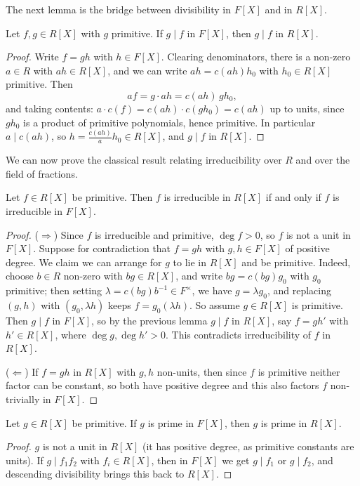 \documentclass[a4paper]{scrartcl}
\begin{document}
The next lemma is the bridge between divisibility in $F[X]$ and in $R[X]$.

\begin{lemma}
	Let $f, g \in R[X]$ with $g$ primitive. If $g \mid f$ in $F[X]$, then $g \mid f$ in $R[X]$.
\end{lemma}
\begin{proof}
	Write $f = gh$ with $h \in F[X]$. Clearing denominators, there is a non-zero $a \in R$ with $ah \in R[X]$, and we can write $ah = c(ah)h_0$ with $h_0 \in R[X]$ primitive. Then
	$$
	af = g \cdot ah = c(ah)\, g h_0,
	$$
	and taking contents: $a \cdot c(f) = c(ah) \cdot c(g h_0) = c(ah)$ up to units, since $gh_0$ is a product of primitive polynomials, hence primitive. In particular $a \mid c(ah)$, so $h = \frac{c(ah)}{a}h_0 \in R[X]$, and $g \mid f$ in $R[X]$.
\end{proof}

We can now prove the classical result relating irreducibility over $R$ and over the field of fractions.

\begin{lemma}
	Let $f \in R[X]$ be primitive. Then $f$ is irreducible in $R[X]$ if and only if $f$ is irreducible in $F[X]$.
\end{lemma}
\begin{proof}
	($\Rightarrow$) Since $f$ is irreducible and primitive, $\deg f > 0$, so $f$ is not a unit in $F[X]$. Suppose for contradiction that $f = gh$ with $g, h \in F[X]$ of positive degree. We claim we can arrange for $g$ to lie in $R[X]$ and be primitive. Indeed, choose $b \in R$ non-zero with $bg \in R[X]$, and write $bg = c(bg)g_0$ with $g_0$ primitive; then setting $\lambda = c(bg)b^{-1} \in F^\times$, we have $g = \lambda g_0$, and replacing $(g, h)$ with $(g_0, \lambda h)$ keeps $f = g_0 (\lambda h)$. So assume $g \in R[X]$ is primitive. Then $g \mid f$ in $F[X]$, so by the previous lemma $g \mid f$ in $R[X]$, say $f = g h'$ with $h' \in R[X]$, where $\deg g, \deg h' > 0$. This contradicts irreducibility of $f$ in $R[X]$.

	($\Leftarrow$) If $f = gh$ in $R[X]$ with $g, h$ non-units, then since $f$ is primitive neither factor can be constant, so both have positive degree and this also factors $f$ non-trivially in $F[X]$.
\end{proof}

\begin{lemma}
	Let $g \in R[X]$ be primitive. If $g$ is prime in $F[X]$, then $g$ is prime in $R[X]$.
\end{lemma}
\begin{proof}
	$g$ is not a unit in $R[X]$ (it has positive degree, as primitive constants are units). If $g \mid f_1 f_2$ with $f_i \in R[X]$, then in $F[X]$ we get $g \mid f_1$ or $g \mid f_2$, and descending divisibility brings this back to $R[X]$.
\end{proof}
\end{document}
